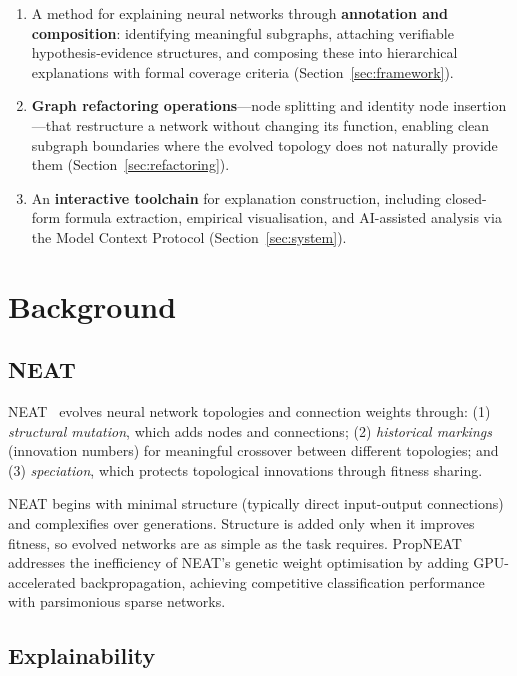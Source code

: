 \documentclass[11pt]{article}
\begin{document}
\begin{enumerate}
    \item A method for explaining neural networks through \textbf{annotation and composition}: identifying meaningful subgraphs, attaching verifiable hypothesis-evidence structures, and composing these into hierarchical explanations with formal coverage criteria (Section~\ref{sec:framework}).

    \item \textbf{Graph refactoring operations}---node splitting and identity node insertion---that restructure a network without changing its function, enabling clean subgraph boundaries where the evolved topology does not naturally provide them (Section~\ref{sec:refactoring}).

    \item An \textbf{interactive toolchain} for explanation construction, including closed-form formula extraction, empirical visualisation, and AI-assisted analysis via the Model Context Protocol (Section~\ref{sec:system}).
\end{enumerate}


\section{Background}
\label{sec:background}

\subsection{NEAT}

NEAT~\cite{stanley2002evolving} evolves neural network topologies and connection weights through: (1) \emph{structural mutation}, which adds nodes and connections; (2) \emph{historical markings} (innovation numbers) for meaningful crossover between different topologies; and (3) \emph{speciation}, which protects topological innovations through fitness sharing.

NEAT begins with minimal structure (typically direct input-output connections) and complexifies over generations. Structure is added only when it improves fitness, so evolved networks are as simple as the task requires. PropNEAT~\cite{merry2025propneat} addresses the inefficiency of NEAT's genetic weight optimisation by adding GPU-accelerated backpropagation, achieving competitive classification performance with parsimonious sparse networks.

\subsection{Explainability}
\end{document}
